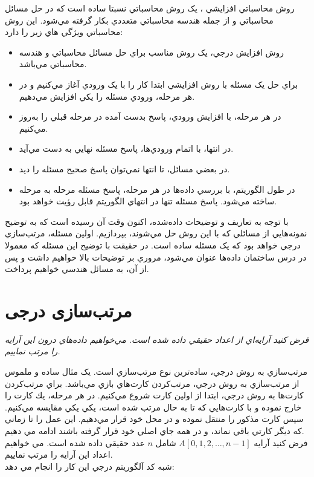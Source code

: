 \documentclass{book}
\begin{document}
	روش محاسباتي افزايشي ، يک روش محاسباتي نسبتا ساده است که در حل مسائل محاسباتي و از جمله هندسه محاسباتي متعددي بکار گرفته مي‌شود. اين روش محاسباتي ويژگي هاي زير را دارد:
	\begin{itemize}
		\item 
		روش افزايش درجي، يک روش مناسب براي حل مسائل محاسباتي و هندسه محاسباتي مي‌باشد.
		\item 
		براي حل يک مسئله با روش افزايشي ابتدا کار را با يک ورودي آغاز مي‌کنيم و در هر مرحله، ورودي مسئله را يکي افزايش مي‌دهيم.
		\item 
		در هر مرحله، با افزايش ورودي، پاسخ بدست آمده در مرحله قبلي را به‌روز مي‌کنيم.
		\item 
		در انتها، با اتمام ورودي‌ها، پاسخ مسئله نهايي به‌ دست مي‌آيد. 
		\item 
		در بعضي مسائل، تا انتها نمي‌توان پاسخ صحيح مسئله را ديد.
		\item 
		در طول الگوريتم، با بررسي داده‌ها در هر مرحله، پاسخ مسئله مرحله به مرحله ساخته مي‌شود. پاسخ مسئله تنها در انتهاي الگوريتم قابل رؤيت خواهد بود.
	\end{itemize}
با توجه به تعاريف و توضيحات داده‌شده، اکنون وقت آن رسيده است که به توضيح نمونه‌هايي از مسائلي که با اين روش حل مي‌شوند، بپردازيم. اولين مسئله، مرتب‌سازي درجي خواهد بود که يک مسئله ساده است. در حقيقت با توضيح اين مسئله که معمولا در درس ساختمان داده‌ها عنوان مي‌شود، مروري بر توضيحات بالا خواهيم داشت و پس از آن، به مسائل هندسي خواهيم پرداخت.
\section*{مرتب‌سازی درجی}
\textit{	فرض کنيد آرايه‌اي از اعداد حقيقي داده شده است. مي‌خواهيم داده‌هاي درون اين آرايه را مرتب نماييم.\\}
	
	مرتب‌سازي به روش درجي، ساده‌ترين نوع مرتب‌سازي است. يک مثال ساده و ملموس از مرتب‌سازي به روش درجي، مرتب‌كردن كارت‌هاي بازي مي‌باشد. براي مرتب‌كردن كارت‌ها  به روش درجي، ابتدا از اولين کارت شروع مي‌کنيم. در هر مرحله، يك كارت را خارج نموده و با كارت‌هايي که تا به‌ حال مرتب شده است، يکي يکي مقايسه مي‌کنيم. سپس كارت مذكور را منتقل نموده و در محل خود قرار مي‌دهيم. اين عمل را تا زماني که ديگر کارتي باقي نماند، و در همه جاي اصلي خود قرار گرفته باشند ادامه مي دهيم. \\
	فرض کنيد آرايه 
	$A[0,1,2,\dots,n-1]$
	 شامل $n$ عدد حقيقي داده شده است. مي خواهيم اعداد اين آرايه را مرتب نماييم.\\
	 شبه کد آلگوريتم درجي اين کار را انجام مي دهد:
\end{document}
